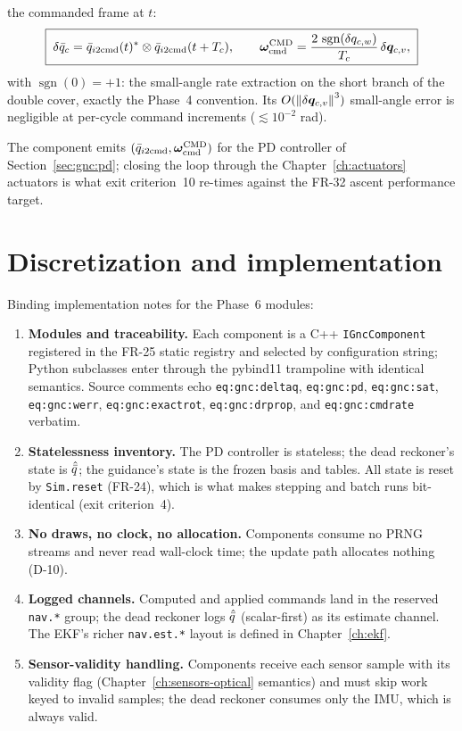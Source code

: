 \begin{enumerate}
    the commanded frame at $t$:
    \begin{equation}
      \boxed{\;
      \delta\bar{q}_c = \bar{q}_{i2\mathrm{cmd}}(t)^{*} \otimes
        \bar{q}_{i2\mathrm{cmd}}(t + T_c),
      \qquad
      \bm{\omega}_{\mathrm{cmd}}^{\mathrm{CMD}} =
        \frac{2\,\operatorname{sgn}(\delta q_{c,w})}{T_c}\,
        \delta\bm{q}_{c,v} ,
      \;}
      \label{eq:gnc:cmdrate}
    \end{equation}
    with $\operatorname{sgn}(0) = +1$: the small-angle rate extraction
    on the short branch of the double cover, exactly the Phase~4
    convention. Its $O(\left\lVert \delta\bm{q}_{c,v} \right\rVert^3)$ small-angle error
    is negligible at per-cycle command increments
    ($\lesssim 10^{-2}$ rad).
\end{enumerate}
The component emits
$(\bar{q}_{i2\mathrm{cmd}}, \bm{\omega}_{\mathrm{cmd}}^{\mathrm{CMD}})$
for the PD controller of Section~\ref{sec:gnc:pd}; closing the loop
through the Chapter~\ref{ch:actuators} actuators is what exit
criterion~10 re-times against the FR-32 ascent performance target.

\section{Discretization and implementation}
\label{sec:gnc:implementation}

Binding implementation notes for the Phase~6 modules:
\begin{enumerate}
  \item \textbf{Modules and traceability.} Each component is a
    C++ \texttt{IGncComponent} registered in the FR-25 static registry
    and selected by configuration string; Python subclasses enter
    through the pybind11 trampoline with identical semantics. Source
    comments echo \texttt{eq:gnc:deltaq}, \texttt{eq:gnc:pd},
    \texttt{eq:gnc:sat}, \texttt{eq:gnc:werr},
    \texttt{eq:gnc:exactrot}, \texttt{eq:gnc:drprop}, and
    \texttt{eq:gnc:cmdrate} verbatim.
  \item \textbf{Statelessness inventory.} The PD controller is
    stateless; the dead reckoner's state is $\hat{\bar{q}}$; the
    guidance's state is the frozen basis and tables. All state is
    reset by \texttt{Sim.reset} (FR-24), which is what makes stepping
    and batch runs bit-identical (exit criterion~4).
  \item \textbf{No draws, no clock, no allocation.} Components consume
    no PRNG streams and never read wall-clock time; the update path
    allocates nothing (D-10).
  \item \textbf{Logged channels.} Computed and applied commands land in
    the reserved \texttt{nav.*} group; the dead reckoner logs
    $\hat{\bar{q}}$ (scalar-first) as its estimate channel. The EKF's
    richer \texttt{nav.est.*} layout is defined in
    Chapter~\ref{ch:ekf}.
  \item \textbf{Sensor-validity handling.} Components receive each
    sensor sample with its validity flag
    (Chapter~\ref{ch:sensors-optical} semantics) and must skip work
    keyed to invalid samples; the dead reckoner consumes only the IMU,
    which is always valid.
\end{enumerate}

